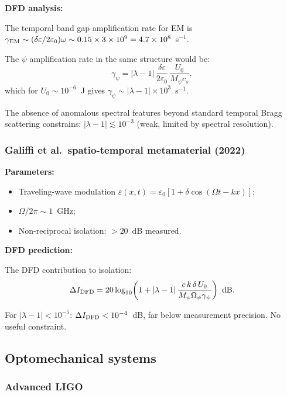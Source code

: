 \documentclass[12pt,aps,prd,twocolumn,superscriptaddress,nofootinbib]{revtex4-2}
\newcommand{\Opsi}{\Omega_\psi}
\newcommand{\gpsi}{\gamma_\psi}
\newcommand{\Mpsi}{M_\psi}
\begin{document}
\textbf{DFD analysis:}

The temporal band gap amplification rate for EM is
$\gamma_{\rm EM} \sim (\delta\varepsilon/2\varepsilon_0)\omega
\sim 0.15\times3\times10^9 = 4.7\times10^8$~s$^{-1}$.

The $\psi$ amplification rate in the same structure would be:
\begin{equation}
\gamma_\psi = |\lambda-1|\,\frac{\delta\varepsilon}{2\varepsilon_0}\,
\frac{U_0}{\Mpsi c_s},
\label{eq:lustig_gamma}
\end{equation}
which for $U_0 \sim 10^{-6}$~J gives
$\gamma_\psi \sim |\lambda-1|\times10^{3}$~s$^{-1}$.

The absence of anomalous spectral features beyond standard
temporal Bragg scattering constrains:
$|\lambda-1| \lesssim 10^{-3}$ (weak, limited by spectral
resolution).

\subsubsection{Galiffi et al.\ spatio-temporal metamaterial (2022)}
\label{sec:galiffi}

\textbf{Parameters:}
\begin{itemize}[noitemsep]
\item Traveling-wave modulation $\varepsilon(x,t) = \varepsilon_0
[1+\delta\cos(\Omega t - kx)]$;
\item $\Omega/2\pi \sim 1$~GHz;
\item Non-reciprocal isolation: $>20$~dB measured.
\end{itemize}

\textbf{DFD prediction:}

The DFD contribution to isolation:
\begin{equation}
\Delta I_{\rm DFD} = 20\log_{10}\!\left(
1 + |\lambda-1|\,\frac{c\,k\,\delta\,U_0}
{\Mpsi\Opsi\gpsi}\right)~{\rm dB}.
\label{eq:galiffi_iso}
\end{equation}

For $|\lambda-1| < 10^{-5}$: $\Delta I_{\rm DFD} < 10^{-4}$~dB,
far below measurement precision.  No useful constraint.

\subsection{Optomechanical systems}

\subsubsection{Advanced LIGO}
\label{sec:ligo}
\end{document}
